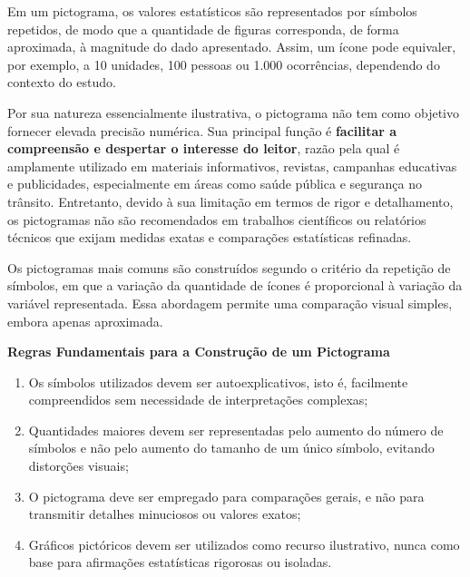 Em um pictograma, os valores estatísticos são representados por símbolos
repetidos, de modo que a quantidade de figuras corresponda, de forma
aproximada, à magnitude do dado apresentado. Assim, um ícone pode equivaler,
por exemplo, a 10 unidades, 100 pessoas ou 1.000 ocorrências, dependendo do
contexto do estudo. \vskip0.3cm

Por sua natureza essencialmente ilustrativa, o pictograma não tem como
objetivo fornecer elevada precisão numérica. Sua principal função é
\textbf{facilitar a compreensão e despertar o interesse do leitor},
razão pela qual é amplamente utilizado em materiais informativos,
revistas, campanhas educativas e publicidades, especialmente em áreas como
saúde pública e segurança no trânsito. Entretanto, devido à sua limitação em termos de rigor e detalhamento,
os pictogramas não são recomendados em trabalhos científicos ou relatórios
técnicos que exijam medidas exatas e comparações estatísticas refinadas. \vskip0.3cm

Os pictogramas mais comuns são construídos segundo o critério da repetição
de símbolos, em que a variação da quantidade de ícones é proporcional à
variação da variável representada. Essa abordagem permite uma comparação
visual simples, embora apenas aproximada.  \vskip0.3cm


\textbf{Regras Fundamentais para a Construção de um Pictograma}

\begin{enumerate}
    \item Os símbolos utilizados devem ser autoexplicativos, isto é,
    facilmente compreendidos sem necessidade de interpretações complexas;
    \item Quantidades maiores devem ser representadas pelo aumento do
    número de símbolos e não pelo aumento do tamanho de um único símbolo,
    evitando distorções visuais;
    \item O pictograma deve ser empregado para comparações gerais,
    e não para transmitir detalhes minuciosos ou valores exatos;
    \item Gráficos pictóricos devem ser utilizados como recurso ilustrativo,
    nunca como base para afirmações estatísticas rigorosas ou isoladas.
\end{enumerate}


